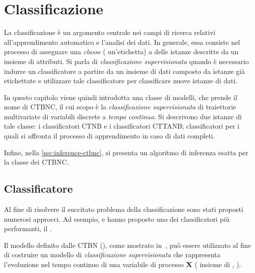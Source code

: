 
\chapter{Classificazione}
\label{cap:ctbnc}
La classificazione è un argomento centrale nei campi di ricerca relativi all'apprendimento automatico e l'analisi dei dati. In generale, essa consiste nel processo di assegnare una \emph{classe} (\ie{} un'etichetta) a delle istanze descritte da un insieme di attributi. Si parla di \emph{classificazione supervisionata} quando è necessario indurre un classificatore a partire da un insieme di dati composto da istanze già etichettate e utilizzare tale classificatore per classificare nuove istanze di dati.

In questo capitolo viene quindi introdotta una classe di modelli, che prende il nome di \acf{CTBNC}, il cui scopo è la \emph{classificazione supervisionata} di traiettorie multivariate di variabili discrete a \emph{tempo continuo}. Si descrivono due istanze di tale classe: i classificatori \acf{CTNB} e i classificatori \acf{CTTANB}; classificatori per i quali si affronta il processo di apprendimento in caso di dati completi.

Infine, nella \autoref{sec:inference-ctbnc}, si presenta un algoritmo di inferenza esatta per la classe dei \acs{CTBNC}.

\section{Classificatore}\label{sec:ctbnc}
Al fine di risolvere il succitato problema della classificazione sono stati proposti numerosi approcci. Ad esempio, \citet{DudaHart1973} e \citet{Langley1992} hanno proposto uno dei classificatori più performanti, il \lwcase \nb{} \class{}.

Il modello definito dalle \acl{CTBN} (), come mostrato in~\citet{Stella2012}, può essere utilizzato al fine di costruire un modello di \emph{classificazione supervisionata} che rappresenta l'evoluzione nel tempo continuo di una variabile di processo $\mathbf{X}$ (\ie{} insieme di \mprocess{}, ).

